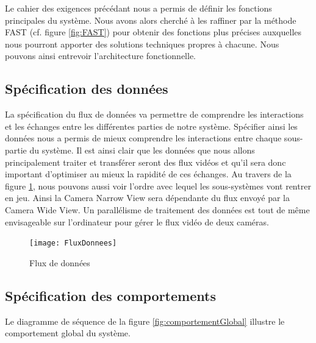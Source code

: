 Le cahier des exigences précédant nous a permis de définir les fonctions principales du système. Nous avons alors cherché à les raffiner par la méthode FAST (cf. figure \ref{fig:FAST}) pour obtenir des fonctions plus précises auxquelles nous pourront apporter des solutions techniques propres à chacune. Nous pouvons ainsi entrevoir l'architecture fonctionnelle.

\subsection{Spécification des données}

La spécification du flux de données va permettre de comprendre les interactions et les échanges entre les différentes parties de notre système. Spécifier ainsi les données nous a permis de mieux comprendre les interactions entre chaque sous-partie du système. Il est ainsi clair que les données que nous allons principalement traiter et transférer seront des flux vidéos et qu’il sera donc important d’optimiser au mieux la rapidité de ces échanges.
Au travers de la figure \ref{fig:fluxDonnees}, nous pouvons aussi voir l’ordre avec lequel les sous-systèmes vont rentrer en jeu. Ainsi la Camera Narrow View sera dépendante du flux envoyé par la Camera Wide View. Un parallélisme de traitement des données est tout de même envisageable sur l'ordinateur pour gérer le flux vidéo de deux caméras.

\begin{figure}[h]
  \centering
  \texttt{[image: FluxDonnees]}
  \caption{Flux de données}
  \label{fig:fluxDonnees}
\end{figure}

\subsection{Spécification des comportements}

Le diagramme de séquence de la figure \ref{fig:comportementGlobal} illustre le comportement global du système. 

